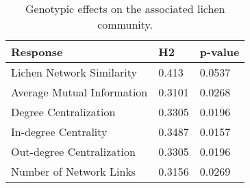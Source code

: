 \begin{table}[ht]
\centering
\begin{tabular}{lll}
  \hline
Response & H2 & p-value \\ 
  \hline
Lichen Network Similarity & 0.413 & 0.0537 \\ 
  Average Mutual Information & 0.3101 & 0.0268 \\ 
  Degree Centralization & 0.3305 & 0.0196 \\ 
  In-degree Centrality & 0.3487 & 0.0157 \\ 
  Out-degree Centralization & 0.3305 & 0.0196 \\ 
  Number of Network Links & 0.3156 & 0.0269 \\ 
   \hline
\end{tabular}
\caption{Genotypic effects on the associated lichen community.} 
\label{tab:h2_net_table}
\end{table}
